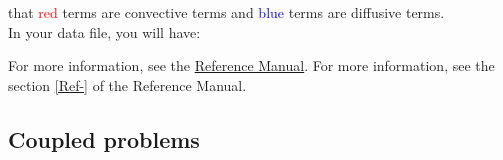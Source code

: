 \Note that \textcolor{red}{red} terms are convective terms and \textcolor{blue}{blue} terms are diffusive terms.\\

In your data file, you will have:

\begin{center}
\end{center}

For more information, see the \href{TRUST_Reference_Manual.pdf\#pbconduction}{\trust Reference Manual}.
For more information, see the section \ref{Ref-} of the Reference Manual.

\subsection{Coupled problems}

